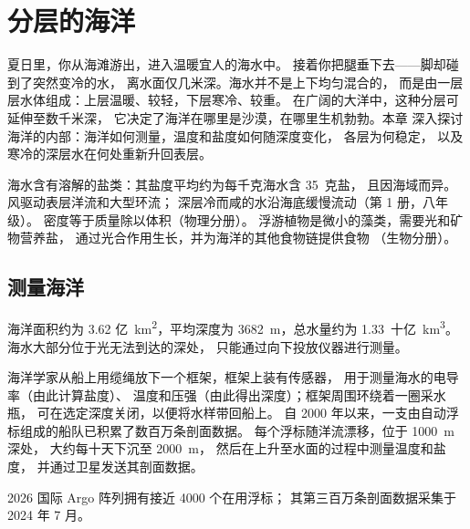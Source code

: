 \chapter{分层的海洋}\label{ch:g10:layered-ocean}

夏日里，你从海滩游出，进入温暖宜人的海水中。
接着你把腿垂下去——脚却碰到了突然变冷的水，
离水面仅几米深。海水并不是上下均匀混合的，
而是由一层层水体组成：上层温暖、较轻，下层寒冷、较重。
在广阔的大洋中，这种分层可延伸至数千米深，
它决定了海洋在哪里是沙漠，在哪里生机勃勃。本章
深入探讨海洋的内部：海洋如何测量，温度和盐度如何随深度变化，
各层为何稳定，
以及寒冷的深层水在何处重新升回表层。

\begin{recall}
海水含有溶解的盐类：其盐度平均约为每千克海水含 \num{35}~克盐，
且因海域而异。风驱动表层洋流和大型环流；
深层冷而咸的水沿海底缓慢流动（第 1 册，八年级）。
密度等于质量除以体积（物理分册）。
浮游植物是微小的藻类，需要光和矿物营养盐，
通过光合作用生长，并为海洋的其他食物链提供食物
（生物分册）。
\end{recall}

\section{测量海洋}

海洋面积约为 3.62 亿~\unit{km^2}，平均深度为
\qty{3682}{m}，总水量约为 \num{1.33}~十亿~\unit{km^3}。
海水大部分位于光无法到达的深处，
只能通过向下投放仪器进行测量。

海洋学家从船上用缆绳放下一个框架，框架上装有传感器，
用于测量海水的电导率（由此计算盐度）、
温度和压强（由此得出深度）；框架周围环绕着一圈采水瓶，
可在选定深度关闭，以便将水样带回船上。
自 2000 年以来，一支由自动浮标组成的船队已积累了数百万条剖面数据。
每个浮标随洋流漂移，位于 \qty{1000}{m} 深处，
大约每十天下沉至 \qty{2000}{m}，
然后在上升至水面的过程中测量温度和盐度，
并通过卫星发送其剖面数据。

\begin{dated}{2026}
国际 Argo 阵列拥有接近 4000 个在用浮标；
其第三百万条剖面数据采集于 2024 年 7 月。
\end{dated}

